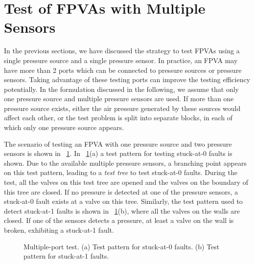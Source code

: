
\section{Test of FPVAs with Multiple Sensors}\label{sec:multi_port}

In the previous sections, we have discussed the strategy to test FPVAs using
a single pressure source and a single pressure sensor. 
In practice, an FPVA may have more than 2 ports 
which can be connected to pressure sources or pressure sensors.
Taking advantage of these testing ports can improve the testing efficiency
potentially. In the formulation discussed in the following, 
we assume that only one pressure source and multiple pressure sensors 
are used. If more than one pressure source exists, either  
the air pressure generated by these sources would affect each other, or the
test problem is split into separate blocks, in each of which only one pressure source
appears.

The scenario of testing an FPVA with one pressure source and two pressure
sensors is shown in \figname~\ref{fig:multi_port_test_example}. In
\figname~\ref{fig:multi_port_test_example}(a) a test pattern for testing
stuck-at-0 faults is shown. Due to the available multiple pressure sensors,
a branching point appears on this test pattern, leading to a \textit{test
tree} to test stuck-at-0 faults.
During the test, all the valves on this test tree
are opened and the valves on the boundary of this tree are closed. If no
pressure is detected at one of the pressure sensors, a stuck-at-0 fault exists
 at a valve on this tree.
Similarly, the test pattern used to detect stuck-at-1 faults is
shown in \figname~\ref{fig:multi_port_test_example}(b), where all the valves on
the walls are closed. If one of the sensors detects a pressure, at least a
valve on the wall is broken, exhibiting a stuck-at-1 fault.

\begin{figure}
{ \figurefontsize
\centering

\caption{Multiple-port test. (a) Test pattern for stuck-at-0 faults. (b) Test pattern for stuck-at-1 faults.}
\label{fig:multi_port_test_example}
}
\end{figure}

